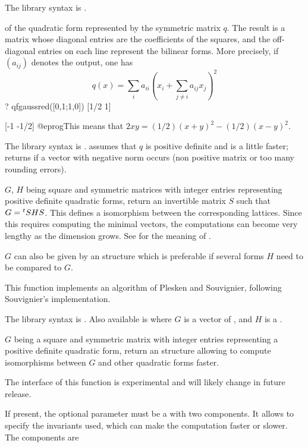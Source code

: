 The library syntax is .

\label{se:qfgaussred}
 of the
quadratic form represented by the symmetric matrix $q$. The result is a
matrix whose diagonal entries are the coefficients of the squares, and the
off-diagonal entries on each line represent the bilinear forms. More
precisely, if $(a_{ij})$ denotes the output, one has
$$ q(x) = \sum_i a_{ii} (x_i + \sum_{j \neq i} a_{ij} x_j)^2 $$
\bprog
? qfgaussred([0,1;1,0])
[1/2 1]

[-1 -1/2]
@eprog\noindent This means that $2xy = (1/2)(x+y)^2 - (1/2)(x-y)^2$.

The library syntax is .
 assumes that $q$ is
 positive definite and is a little faster; returns  if a vector
 with negative norm occurs (non positive matrix or too many rounding errors).

\label{se:qfisom}
$G$, $H$ being square and symmetric matrices with integer entries representing
positive definite quadratic forms, return an invertible matrix $S$ such that
$G={^t}S\*H\*S$. This defines a isomorphism between the corresponding lattices.
Since this requires computing the minimal vectors, the computations can
become very lengthy as the dimension grows.
See  for the meaning of .

$G$ can also be given by an  structure which is preferable if
several forms $H$ need to be compared to $G$.

This function implements an algorithm of Plesken and Souvignier, following
Souvignier's implementation.

The library syntax is .
Also available is 
where $G$ is a vector of , and $H$ is a .

\label{se:qfisominit}
$G$ being a square and symmetric matrix with integer entries representing a
positive definite quadratic form, return an  structure allowing to
compute isomorphisms between $G$ and other quadratic forms faster.

The interface of this function is experimental and will likely change in future
release.

If present, the optional parameter  must be a  with two
components. It allows to specify the invariants used, which can make the
computation faster or slower. The components are

